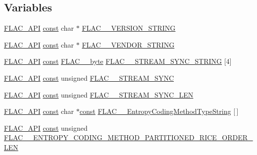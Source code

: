 \subsection*{Variables}
\begin{DoxyCompactItemize}
\item 
\hyperlink{group__flac__export_ga56ca07df8a23310707732b1c0007d6f5}{F\+L\+A\+C\+\_\+\+A\+PI} \hyperlink{getopt1_8c_a2c212835823e3c54a8ab6d95c652660e}{const} char $\ast$ \hyperlink{group__flac__format_ga1bd3aa4d4ce0393e51dd55bb3e48fbc1}{F\+L\+A\+C\+\_\+\+\_\+\+V\+E\+R\+S\+I\+O\+N\+\_\+\+S\+T\+R\+I\+NG}
\item 
\hyperlink{group__flac__export_ga56ca07df8a23310707732b1c0007d6f5}{F\+L\+A\+C\+\_\+\+A\+PI} \hyperlink{getopt1_8c_a2c212835823e3c54a8ab6d95c652660e}{const} char $\ast$ \hyperlink{group__flac__format_gac05d5441acd3daad33d287165c450a05}{F\+L\+A\+C\+\_\+\+\_\+\+V\+E\+N\+D\+O\+R\+\_\+\+S\+T\+R\+I\+NG}
\item 
\hyperlink{group__flac__export_ga56ca07df8a23310707732b1c0007d6f5}{F\+L\+A\+C\+\_\+\+A\+PI} \hyperlink{getopt1_8c_a2c212835823e3c54a8ab6d95c652660e}{const} \hyperlink{ordinals_8h_a5eb569b12d5b047cdacada4d57924ee3}{F\+L\+A\+C\+\_\+\+\_\+byte} \hyperlink{group__flac__format_gab988d92256bae952bd337a55da5e89d0}{F\+L\+A\+C\+\_\+\+\_\+\+S\+T\+R\+E\+A\+M\+\_\+\+S\+Y\+N\+C\+\_\+\+S\+T\+R\+I\+NG} \mbox{[}4\mbox{]}
\item 
\hyperlink{group__flac__export_ga56ca07df8a23310707732b1c0007d6f5}{F\+L\+A\+C\+\_\+\+A\+PI} \hyperlink{getopt1_8c_a2c212835823e3c54a8ab6d95c652660e}{const} unsigned \hyperlink{group__flac__format_ga9c002aa5e3dd4f534be5309a6bcfd664}{F\+L\+A\+C\+\_\+\+\_\+\+S\+T\+R\+E\+A\+M\+\_\+\+S\+Y\+NC}
\item 
\hyperlink{group__flac__export_ga56ca07df8a23310707732b1c0007d6f5}{F\+L\+A\+C\+\_\+\+A\+PI} \hyperlink{getopt1_8c_a2c212835823e3c54a8ab6d95c652660e}{const} unsigned \hyperlink{group__flac__format_ga71d8c89809a47f79c8650a2e331436f0}{F\+L\+A\+C\+\_\+\+\_\+\+S\+T\+R\+E\+A\+M\+\_\+\+S\+Y\+N\+C\+\_\+\+L\+EN}
\item 
\hyperlink{group__flac__export_ga56ca07df8a23310707732b1c0007d6f5}{F\+L\+A\+C\+\_\+\+A\+PI} \hyperlink{getopt1_8c_a2c212835823e3c54a8ab6d95c652660e}{const} char $\ast$\hyperlink{getopt1_8c_a2c212835823e3c54a8ab6d95c652660e}{const} \hyperlink{group__flac__format_gaf4f3faf80000ebe7cc357af9bbbaa3b4}{F\+L\+A\+C\+\_\+\+\_\+\+Entropy\+Coding\+Method\+Type\+String} \mbox{[}$\,$\mbox{]}
\item 
\hyperlink{group__flac__export_ga56ca07df8a23310707732b1c0007d6f5}{F\+L\+A\+C\+\_\+\+A\+PI} \hyperlink{getopt1_8c_a2c212835823e3c54a8ab6d95c652660e}{const} unsigned \hyperlink{group__flac__format_ga9839a3378f519e065a3599585e4a9588}{F\+L\+A\+C\+\_\+\+\_\+\+E\+N\+T\+R\+O\+P\+Y\+\_\+\+C\+O\+D\+I\+N\+G\+\_\+\+M\+E\+T\+H\+O\+D\+\_\+\+P\+A\+R\+T\+I\+T\+I\+O\+N\+E\+D\+\_\+\+R\+I\+C\+E\+\_\+\+O\+R\+D\+E\+R\+\_\+\+L\+EN}

\end{DoxyCompactItemize}
